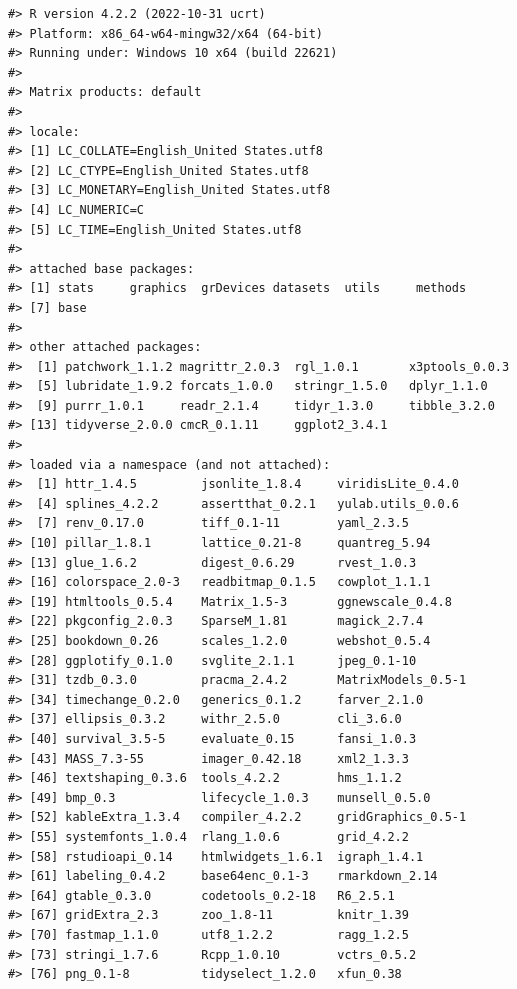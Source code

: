 \documentclass[11pt,]{isuthesis}
\begin{document}
\begin{verbatim}
#> R version 4.2.2 (2022-10-31 ucrt)
#> Platform: x86_64-w64-mingw32/x64 (64-bit)
#> Running under: Windows 10 x64 (build 22621)
#> 
#> Matrix products: default
#> 
#> locale:
#> [1] LC_COLLATE=English_United States.utf8 
#> [2] LC_CTYPE=English_United States.utf8   
#> [3] LC_MONETARY=English_United States.utf8
#> [4] LC_NUMERIC=C                          
#> [5] LC_TIME=English_United States.utf8    
#> 
#> attached base packages:
#> [1] stats     graphics  grDevices datasets  utils     methods  
#> [7] base     
#> 
#> other attached packages:
#>  [1] patchwork_1.1.2 magrittr_2.0.3  rgl_1.0.1       x3ptools_0.0.3 
#>  [5] lubridate_1.9.2 forcats_1.0.0   stringr_1.5.0   dplyr_1.1.0    
#>  [9] purrr_1.0.1     readr_2.1.4     tidyr_1.3.0     tibble_3.2.0   
#> [13] tidyverse_2.0.0 cmcR_0.1.11     ggplot2_3.4.1  
#> 
#> loaded via a namespace (and not attached):
#>  [1] httr_1.4.5         jsonlite_1.8.4     viridisLite_0.4.0 
#>  [4] splines_4.2.2      assertthat_0.2.1   yulab.utils_0.0.6 
#>  [7] renv_0.17.0        tiff_0.1-11        yaml_2.3.5        
#> [10] pillar_1.8.1       lattice_0.21-8     quantreg_5.94     
#> [13] glue_1.6.2         digest_0.6.29      rvest_1.0.3       
#> [16] colorspace_2.0-3   readbitmap_0.1.5   cowplot_1.1.1     
#> [19] htmltools_0.5.4    Matrix_1.5-3       ggnewscale_0.4.8  
#> [22] pkgconfig_2.0.3    SparseM_1.81       magick_2.7.4      
#> [25] bookdown_0.26      scales_1.2.0       webshot_0.5.4     
#> [28] ggplotify_0.1.0    svglite_2.1.1      jpeg_0.1-10       
#> [31] tzdb_0.3.0         pracma_2.4.2       MatrixModels_0.5-1
#> [34] timechange_0.2.0   generics_0.1.2     farver_2.1.0      
#> [37] ellipsis_0.3.2     withr_2.5.0        cli_3.6.0         
#> [40] survival_3.5-5     evaluate_0.15      fansi_1.0.3       
#> [43] MASS_7.3-55        imager_0.42.18     xml2_1.3.3        
#> [46] textshaping_0.3.6  tools_4.2.2        hms_1.1.2         
#> [49] bmp_0.3            lifecycle_1.0.3    munsell_0.5.0     
#> [52] kableExtra_1.3.4   compiler_4.2.2     gridGraphics_0.5-1
#> [55] systemfonts_1.0.4  rlang_1.0.6        grid_4.2.2        
#> [58] rstudioapi_0.14    htmlwidgets_1.6.1  igraph_1.4.1      
#> [61] labeling_0.4.2     base64enc_0.1-3    rmarkdown_2.14    
#> [64] gtable_0.3.0       codetools_0.2-18   R6_2.5.1          
#> [67] gridExtra_2.3      zoo_1.8-11         knitr_1.39        
#> [70] fastmap_1.1.0      utf8_1.2.2         ragg_1.2.5        
#> [73] stringi_1.7.6      Rcpp_1.0.10        vctrs_0.5.2       
#> [76] png_0.1-8          tidyselect_1.2.0   xfun_0.38
\end{verbatim}
\end{document}
